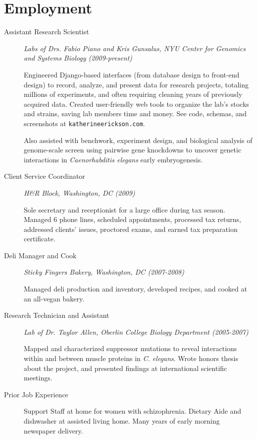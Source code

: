 \documentclass{article}
\newcommand{\website}{\texttt{katherineerickson.com}}
\begin{document}
  \section*{Employment}
  \begin{description}
    \item[Assistant Research Scientist]
    \emph{Labs of Drs. Fabio Piano and Kris Gunsalus, NYU Center for Genomics
        and Systems Biology (2009-present)}

    Engineered Django-based interfaces (from database design to front-end
    design) to record, analyze, and present data for research projects,
    totaling millions of experiments, and often requiring cleaning years
    of previously acquired data.
    Created user-friendly web tools to organize the lab's
    stocks and strains, saving lab members time and money.
    See code, schemas, and screenshots at \website.

    Also assisted with benchwork, experiment design, and biological analysis of
    genome-scale screen using pairwise gene knockdowns to uncover
    genetic interactions in \emph{Caenorhabditis elegans} early embryogenesis.

    \item[Client Service Coordinator]
    \emph{H\&R Block, Washington, DC (2009)}

    Sole secretary and receptionist for a large office during tax season.
    Managed 6 phone lines, scheduled appointments, processed tax returns,
    addressed clients' issues, proctored exams, and earned tax preparation
    certificate.

    \item[Deli Manager and Cook]
    \emph{Sticky Fingers Bakery, Washington, DC (2007-2008)}

    Managed deli production and inventory, developed recipes,
    and cooked at an all-vegan bakery.

    \item[Research Technician and Assistant]
    \emph{Lab of Dr. Taylor Allen, Oberlin College Biology Department
        (2005-2007)}

    Mapped and characterized suppressor mutations to reveal interactions
    within and between muscle proteins in \emph{C. elegans}.
    Wrote honors thesis about the project,
    and presented findings at international scientific meetings.

    \item[Prior Job Experience]
    Support Staff at home for women with schizophrenia.
    Dietary Aide and dishwasher at assisted living home.
    Many years of early morning newspaper delivery.
  \end{description}
\end{document}
